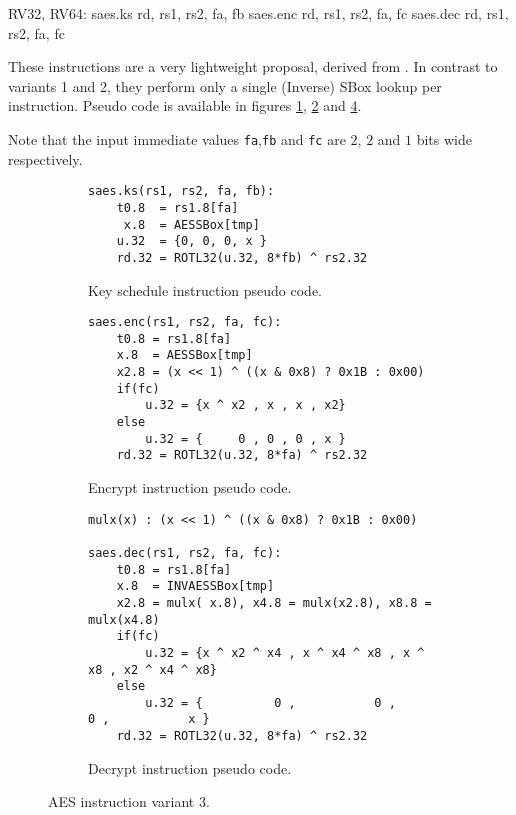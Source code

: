 \begin{cryptoisa}
RV32, RV64:
    saes.ks     rd, rs1, rs2, fa, fb    
    saes.enc    rd, rs1, rs2, fa, fc
    saes.dec    rd, rs1, rs2, fa, fc
\end{cryptoisa}

These instructions are a very lightweight proposal, derived from
\cite{MJS:20}.
In contrast to variants 1 and 2, they perform only a single (Inverse) SBox
lookup per instruction.
Pseudo code is available in figures
\ref{fig:pesudo:aes:v3:ks},
\ref{fig:pesudo:aes:v3:enc} and
\ref{fig:pesudo:aes:v3:dec}.

Note that the input immediate values {\tt fa},{\tt fb} and {\tt fc}
are $2$, $2$ and $1$ bits wide respectively.

\begin{figure}

\begin{subfigure}[b]{1.0\textwidth}
\begin{lstlisting}
saes.ks(rs1, rs2, fa, fb):
    t0.8  = rs1.8[fa]
     x.8  = AESSBox[tmp]
    u.32  = {0, 0, 0, x }
    rd.32 = ROTL32(u.32, 8*fb) ^ rs2.32
\end{lstlisting}
\caption{Key schedule instruction pseudo code.}
\label{fig:pesudo:aes:v3:ks}
\end{subfigure}

\begin{subfigure}[b]{1.0\textwidth}
\begin{lstlisting}
saes.enc(rs1, rs2, fa, fc):
    t0.8 = rs1.8[fa]
    x.8  = AESSBox[tmp]
    x2.8 = (x << 1) ^ ((x & 0x8) ? 0x1B : 0x00)
    if(fc)
        u.32 = {x ^ x2 , x , x , x2}
    else
        u.32 = {     0 , 0 , 0 , x }
    rd.32 = ROTL32(u.32, 8*fa) ^ rs2.32
\end{lstlisting}
\caption{Encrypt instruction pseudo code.}
\label{fig:pesudo:aes:v3:enc}
\end{subfigure}

\begin{subfigure}[b]{1.0\textwidth}
\begin{lstlisting}
mulx(x) : (x << 1) ^ ((x & 0x8) ? 0x1B : 0x00)

saes.dec(rs1, rs2, fa, fc):
    t0.8 = rs1.8[fa]
    x.8  = INVAESSBox[tmp]
    x2.8 = mulx( x.8), x4.8 = mulx(x2.8), x8.8 = mulx(x4.8)
    if(fc)
        u.32 = {x ^ x2 ^ x4 , x ^ x4 ^ x8 , x ^ x8 , x2 ^ x4 ^ x8}
    else
        u.32 = {          0 ,           0 ,      0 ,           x }
    rd.32 = ROTL32(u.32, 8*fa) ^ rs2.32
\end{lstlisting}
\caption{Decrypt instruction pseudo code.}
\label{fig:pesudo:aes:v3:dec}
\end{subfigure}
\caption{AES instruction variant 3.}
\end{figure}

